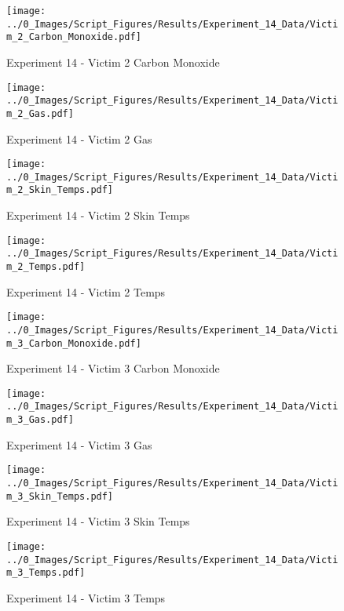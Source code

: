 	\begin{figure}[H]
		\centering
		\texttt{[image: ../0\_Images/Script\_Figures/Results/Experiment\_14\_Data/Victim\_2\_Carbon\_Monoxide.pdf]}
		\caption[]{Experiment 14 - Victim 2 Carbon Monoxide}
	\end{figure}
 
	\clearpage

	\begin{figure}[H]
		\centering
		\texttt{[image: ../0\_Images/Script\_Figures/Results/Experiment\_14\_Data/Victim\_2\_Gas.pdf]}
		\caption[]{Experiment 14 - Victim 2 Gas}
	\end{figure}
 

	\begin{figure}[H]
		\centering
		\texttt{[image: ../0\_Images/Script\_Figures/Results/Experiment\_14\_Data/Victim\_2\_Skin\_Temps.pdf]}
		\caption[]{Experiment 14 - Victim 2 Skin Temps}
	\end{figure}
 
	\clearpage

	\begin{figure}[H]
		\centering
		\texttt{[image: ../0\_Images/Script\_Figures/Results/Experiment\_14\_Data/Victim\_2\_Temps.pdf]}
		\caption[]{Experiment 14 - Victim 2 Temps}
	\end{figure}
 

	\begin{figure}[H]
		\centering
		\texttt{[image: ../0\_Images/Script\_Figures/Results/Experiment\_14\_Data/Victim\_3\_Carbon\_Monoxide.pdf]}
		\caption[]{Experiment 14 - Victim 3 Carbon Monoxide}
	\end{figure}
 
	\clearpage

	\begin{figure}[H]
		\centering
		\texttt{[image: ../0\_Images/Script\_Figures/Results/Experiment\_14\_Data/Victim\_3\_Gas.pdf]}
		\caption[]{Experiment 14 - Victim 3 Gas}
	\end{figure}
 

	\begin{figure}[H]
		\centering
		\texttt{[image: ../0\_Images/Script\_Figures/Results/Experiment\_14\_Data/Victim\_3\_Skin\_Temps.pdf]}
		\caption[]{Experiment 14 - Victim 3 Skin Temps}
	\end{figure}
 
	\clearpage

	\begin{figure}[H]
		\centering
		\texttt{[image: ../0\_Images/Script\_Figures/Results/Experiment\_14\_Data/Victim\_3\_Temps.pdf]}
		\caption[]{Experiment 14 - Victim 3 Temps}
	\end{figure}
 

